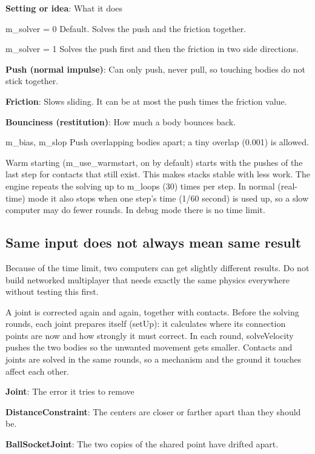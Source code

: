 \documentclass[11pt,a4paper]{article}
\begin{document}
\textbf{Setting or idea}: What it does

m\_solver = 0                                Default. Solves the push and the friction together.

m\_solver = 1                                Solves the push first and then the friction in two side directions.

\textbf{Push (normal impulse)}: Can only push, never pull, so touching bodies do not stick together.

\textbf{Friction}: Slows sliding. It can be at most the push times the friction value.

\textbf{Bounciness (restitution)}: How much a body bounces back.

m\_bias, m\_slop                              Push overlapping bodies apart; a tiny overlap (0.001) is allowed.

Warm starting (m\_use\_warmstart, on by default) starts with the pushes of the last step for contacts that still exist. This makes stacks stable with less work. The engine repeats the solving up to m\_loops (30) times per step. In normal (real-time) mode it also stops when one step's time (1/60 second) is used up, so a slow computer may do fewer rounds. In debug mode there is no time limit.

\subsection*{Same input does not always mean same result}
Because of the time limit, two computers can get slightly different results. Do not build networked multiplayer that needs exactly the same physics everywhere without testing this first.

\label{vpe-core-16}
A joint is corrected again and again, together with contacts. Before the solving rounds, each joint prepares itself (setUp): it calculates where its connection points are now and how strongly it must correct. In each round, solveVelocity pushes the two bodies so the unwanted movement gets smaller. Contacts and joints are solved in the same rounds, so a mechanism and the ground it touches affect each other.

\textbf{Joint}: The error it tries to remove

\textbf{DistanceConstraint}: The centers are closer or farther apart than they should be.

\textbf{BallSocketJoint}: The two copies of the shared point have drifted apart.
\end{document}
